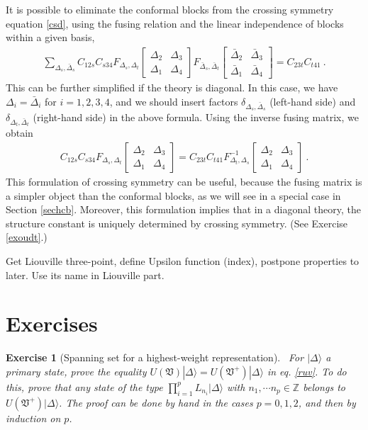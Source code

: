 \documentclass[12pt, a4paper, notitlepage, twoside]{report}
\numberwithin{equation}{section}
\theoremstyle{break}
\newtheorem{exo}{Exercise}[chapter]
\begin{document}
It is possible to eliminate the conformal blocks from the crossing symmetry equation \eqref{csd}, using the fusing relation and the linear independence of blocks within a given basis,
\begin{align}
 \sum_{\Delta_s,\bar{\Delta}_s} C_{12s} C_{s34}
F_{\Delta_s,\Delta_t}\begin{bmatrix} \Delta_2 & \Delta_3 \\ \Delta_1 & \Delta_4 \end{bmatrix}
F_{\bar{\Delta}_s,\bar{\Delta}_t}\begin{bmatrix} \bar{\Delta}_2 & \bar{\Delta}_3 \\ \bar{\Delta}_1 & \bar{\Delta}_4 \end{bmatrix}
=  C_{23t}C_{t41}\ .
\end{align}
This can be further simplified if the theory is diagonal.
In this case, we have $\Delta_i=\bar{\Delta}_i$ for $i=1,2,3,4$, and we should insert factors $\delta_{\Delta_s,\bar\Delta_s}$ (left-hand side) and $\delta_{\Delta_t,\bar\Delta_t}$ (right-hand side) in the above formula.
Using the inverse fusing matrix, we obtain 
\begin{align}
 C_{12s} C_{s34}
F_{\Delta_s,\Delta_t}\begin{bmatrix} \Delta_2 & \Delta_3 \\ \Delta_1 & \Delta_4 \end{bmatrix}
= C_{23t}C_{t41} 
F^{-1}_{\Delta_t,\Delta_s}\begin{bmatrix} \Delta_2 & \Delta_3 \\ \Delta_1 & \Delta_4 \end{bmatrix}
\ .
\label{ffm}
\end{align}
This formulation of crossing symmetry can be useful, because the fusing matrix is a simpler object than the conformal blocks, as we will see in a special case in Section \ref{sechcb}. Moreover, this formulation implies that in a diagonal theory, the structure constant is uniquely determined by crossing symmetry. (See Exercise \ref{exoudt}.)

Get Liouville three-point, define Upsilon function (index), postpone properties to later. Use its name in Liouville part.

\section{Exercises}

\begin{exo}[Spanning set for a highest-weight representation]
 ~\label{exospan}
For $|\Delta\rangle$ a primary state, prove the equality $U(\mathfrak{V})|\Delta\rangle =U(\mathfrak{V}^+)|\Delta\rangle$ in eq. \eqref{ruv}.
To do this, prove that any state of the type $\prod_{i=1}^p L_{n_i}|\Delta\rangle$ with $n_1,\cdots n_p\in {\mathbb{Z}}$ belongs to $U(\mathfrak{V}^+)|\Delta\rangle$.
The proof can be done by hand in the cases $p=0,1,2$, and then by induction on $p$.
\end{exo}
\end{document}
